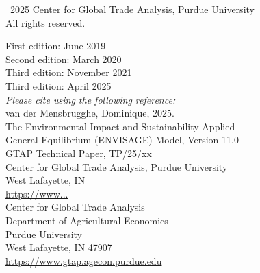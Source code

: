 \documentclass[11pt,letterpaper]{report}
\begin{document}
\normalsize
\clearpage


\pagestyle{empty}

\vspace*{2cm}
\footnotesize
\noindent \textcopyright \, 2025 Center for Global Trade Analysis, Purdue University \\
All rights reserved.

\vspace{3cm}
\noindent First edition: June 2019 \\
\noindent Second edition: March 2020 \\
\noindent Third edition: November 2021 \\
\noindent Third edition: April 2025 \\

\vspace{4cm}
\noindent \emph{Please cite using the following reference:} \\
\hspace*{0.25cm} van der Mensbrugghe, Dominique, 2025. \\
\hspace*{0.5cm} The Environmental Impact and Sustainability Applied \\
\hspace*{0.5cm} General Equilibrium (ENVISAGE) Model, Version 11.0 \\
\hspace*{0.5cm} GTAP Technical Paper, TP/25/xx \\
\hspace*{0.5cm} Center for Global Trade Analysis, Purdue University \\
\hspace*{0.5cm} West Lafayette, IN \\
\hspace*{0.5cm} \url{https://www...} \\

\vspace{2cm}
\noindent Center for Global Trade Analysis \\
Department of Agricultural Economics \\
Purdue University \\
West Lafayette, IN 47907 \\
\url{https://www.gtap.agecon.purdue.edu} \\
\clearpage
\end{document}
